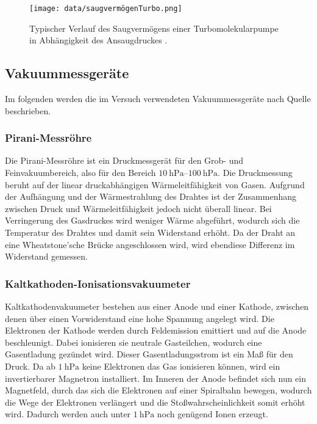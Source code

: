 \begin{figure}[H]
    \centering
    \texttt{[image: data/saugvermögenTurbo.png]}
    \caption{Typischer Verlauf des Saugvermögens einer Turbomolekularpumpe in Abhängigkeit des Ansaugdruckes \cite{Turbomolekularpumpen}.}
    \label{fig:SaugvermögenTurbo}
\end{figure}

\subsection{Vakuummessgeräte}
\label{subsec:vakuummesser}

Im folgenden werden die im Versuch verwendeten Vakuummessgeräte nach Quelle \cite{Totaldruckmessung} beschrieben.

\subsubsection{Pirani-Messröhre}
\label{subsubsec:pirani}

Die Pirani-Messröhre ist ein Druckmessgerät für den Grob- und Feinvakuumbereich, also für den Bereich $\SIrange{10}{100}{\hecto\pascal}$. Die Druckmessung beruht auf der linear druckabhängigen Wärmeleitfähigkeit von Gasen. Aufgrund der Aufhängung und der Wärmestrahlung des Drahtes ist der Zusammenhang zwischen 
Druck und Wärmeleitfähigkeit jedoch nicht überall linear. Bei Verringerung des Gasdruckes wird weniger Wärme abgeführt, wodurch sich die Temperatur des Drahtes und damit sein Widerstand erhöht. Da der Draht an eine Wheatstone'sche Brücke angeschlossen wird, 
wird ebendiese Differenz im Widerstand gemessen. 

\subsubsection{Kaltkathoden-Ionisationsvakuumeter}
\label{subsubsec:kaltkathode}

Kaltkathodenvakuumeter bestehen aus einer Anode und einer Kathode, zwischen denen über einen Vorwiderstand eine hohe Spannung angelegt wird. Die Elektronen der Kathode werden durch Feldemission emittiert und auf die Anode beschleunigt.
Dabei ionisieren sie neutrale Gasteilchen, wodurch eine Gasentladung gezündet wird. Dieser Gasentladungsstrom ist ein Maß für den Druck. Da ab $\SI{1}{\hecto\pascal}$ keine Elektronen das Gas ionisieren können,
wird ein invertierbarer Magnetron installiert. Im Inneren der Anode befindet sich nun ein Magnetfeld, durch das sich die Elektronen auf einer Spiralbahn bewegen, wodurch die Wege der Elektronen verlängert und die Stoßwahrscheinlichkeit somit 
erhöht wird. Dadurch werden auch unter $\SI{1}{\hecto\pascal}$ noch genügend Ionen erzeugt.

